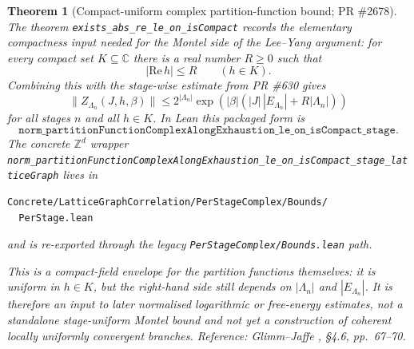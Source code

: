 \documentclass[a4paper,11pt]{article}
\newtheorem{theorem}{Theorem}
\begin{document}
\begin{theorem}[Compact-uniform complex partition-function bound; PR \#2678]
The theorem
\texttt{exists\_abs\_re\_le\_on\_isCompact} records the elementary
compactness input needed for the Montel side of the Lee--Yang argument: for
every compact set $K\subseteq\mathbb C$ there is a real number $R\ge 0$ such
that
\[
  |\mathrm{Re}\,h|\le R\qquad (h\in K).
\]
Combining this with the stage-wise estimate from PR \#630 gives
\[
  \|Z_{\Lambda_n}(J,h,\beta)\|
  \le
  2^{|\Lambda_n|}
  \exp\!\left(|\beta|\left(|J|\,|E_{\Lambda_n}|+R|\Lambda_n|\right)\right)
\]
for all stages $n$ and all $h\in K$.  In Lean this packaged form is
\[
  \texttt{norm\_partitionFunctionComplexAlongExhaustion\_le\_on\_isCompact\_stage}.
\]
The concrete $\mathbb Z^d$ wrapper
\texttt{norm\_partitionFunctionComplexAlongExhaustion\_le\_on\_isCompact\_stage\_latticeGraph}
lives in
\begin{Verbatim}[fontsize=\footnotesize]
Concrete/LatticeGraphCorrelation/PerStageComplex/Bounds/
  PerStage.lean
\end{Verbatim}
and is re-exported through the legacy
\texttt{PerStageComplex/Bounds.lean} path.

This is a compact-field envelope for the partition functions themselves: it is
uniform in $h\in K$, but the right-hand side still depends on $|\Lambda_n|$ and
$|E_{\Lambda_n}|$.  It is therefore an input to later normalised logarithmic
or free-energy estimates, not a standalone stage-uniform Montel bound and not
yet a construction of coherent locally uniformly convergent branches.
Reference: Glimm--Jaffe \cite{glimm-jaffe}, \S 4.6, pp.~67--70.
\end{theorem}
\end{document}
